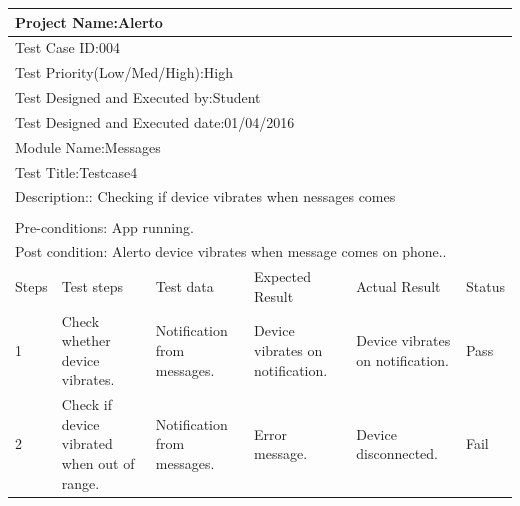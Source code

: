 \documentclass[12pt,a4paper]{report}
\begin{document}
\begin{table}[!h]
	
	\begin{tabular}{|p{0.8cm}|p{2.5cm}|p{3cm}|p{3cm}|p{3cm}|p{2.2cm}|}
		\hline
		\multicolumn{6}{|l|}{Project Name:Alerto}\\
		\hline
		\multicolumn{6}{|l|}{Test Case ID:004}\\
		\hline
		\multicolumn{6}{|l|}{Test Priority(Low/Med/High):High} \\ 
		\hline
		\multicolumn{6}{|l|}{Test Designed and Executed by:Student}\\
		\hline
		\multicolumn{6}{|l|}{Test Designed and Executed date:01/04/2016}\\
		\hline
		\multicolumn{6}{|l|}{Module Name:Messages} \\ 
		\hline
		\multicolumn{6}{|l|}{Test Title:Testcase4} \\
		\hline
		\multicolumn{6}{|l|}{Description:: Checking if device vibrates when nessages comes} \\
		\hline
		\\
		\hline
		\multicolumn{6}{|l|}{Pre-conditions: App running.}\\
		\hline
		\multicolumn{6}{|l|}{Post condition: Alerto device vibrates when message comes on phone..}\\
		\hline
		Steps & Test steps & Test data & Expected Result & Actual Result & Status \\ 
		\hline
		1&	Check whether device vibrates.&	Notification from messages.&	Device vibrates on notification.&	Device vibrates on notification.&	Pass\\
		\hline
		2&	Check if device vibrated when out of range.&	Notification from messages.&	Error message.&	Device disconnected.&	Fail\\
		
		\hline
	\end{tabular}
\end{table}
\end{document}
